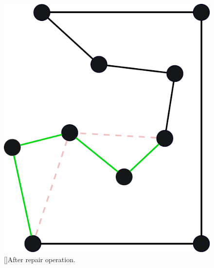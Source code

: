 \documentclass[aspectratio=1610]{beamer}
\begin{document}
\begin{frame}[noframenumbering]
{\begin{minipage}[t]{.3\textwidth}
\begin{figure}
	\includegraphics[width=\textwidth]{graphics/tsp-repair-solution} 
	[]{After repair operation.}
\end{figure}
\end{minipage}%
}

\end{frame}
\end{document}
